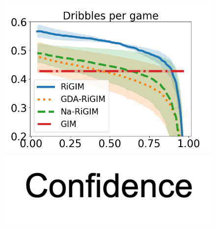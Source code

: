 \documentclass[letterpaper]{article} %
\begin{document}
\begin{figure}[htbp]
\begin{minipage}{0.16\textwidth}
    \includegraphics[scale=0.16]{figures/soccer_risk_curve_Drb_shadow.png}\par
    \vspace{-0.05in}
    \includegraphics[scale=0.12]{figures/confidence_x_label.png}
    \end{minipage}
    \begin{minipage}{0.01\textwidth}
    \centering

\end{minipage}
\end{figure}
\end{document}
